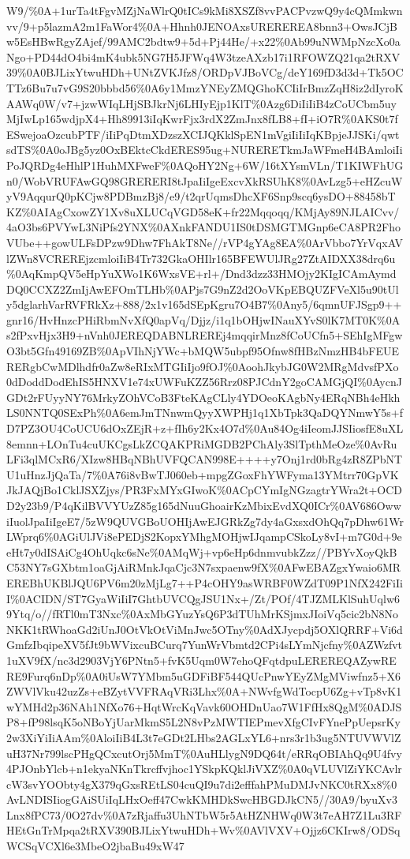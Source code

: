 \documentclass[]{article}
\begin{document}
W9/\%0A+1urTa4tFgvMZjNaWlrQ0tICs9kMi8XSZf8vvPACPvzwQ9y4cQMmkwnvv/9+p5lazmA2m1FaWor4\%0A+Hhnh0JENOAxsUREREREA8bnn3+OwsJCjBw5EsHBwRgyZAjef/99AMC2bdtw9+5d+Pj44He/+x22\%0Ab99uNWMpNzcXo0aNgo+PD44dO4bi4mK4ubk5NG7H5JFWq4W3tzeAXzb17i1RFOWZQ21qa2tRXV39\%0A0BJLixYtwuHDh+UNtZVKJfz8/ORDpVJBoVCg/deY169fD3d3d+Tk5OCTTz6Bu7u7vG9S20bbbd56\%0A6y1MmzYNEyZMQGhoKCIiIrBmzZqH8iz2dIyroKAAWq0W/v7+jzwWIqLHjSBJkrNj6LHIyEjp1KlT\%0Azg6DiIiIiB4zCoUCbm5uyMjIwLp165wdjpX4+Hh89913iIqKwrFjx3rdX2ZmJnx8fLB8+fI+iO7R\%0AKS0t7fESwejoaOzcubPTF/iIiPqDtmXDzszXCIJQKklSpEN1mVgiIiIiIqKBpjeJJSKi/qwtsdTS\%0A0oJBg5yz0OxBEktcCkdERES95ug+NURERETkmJaWFmeH4BAmloiIiPoJQRDg4eHhlP1HuhMXFweF\%0AQoHY2Ng+6W/16tXYsmVLn/T1KIWFhUGn0/WobVRUFAwGQ98GRERERI8tJpaIiIgeExcvXkRSUhK8\%0AvLzg5+eHZcuWyV9AqqurQ0pKCjw8PDBmzBj8/e9/t2qrUqmsDhcXF6Snp9scq6ysDO+88458bTKZ\%0AIAgCxowZY1Xv8uXLUCqVGD58eK+fr22Mqqoqq/KMjAy89NJLAICvv/4aO3bs6PVYwL3NiPfs2YNX\%0AXnkFANDU1IS0tDSMGTMGnp6eCA8PR2FhoVUbe++gowULFsDPzw9Dhw7FhAkT8Ne//rVP4gYAg8EA\%0ArVbbo7YrVqxAVlZWn8VCREREjzcmloiIiB4Tr732GkaOHIlr165BFEWUlJRg27ZtAIDXX38drq6u\%0AqKmpQV5eHpYuXWo1K6WxsVE+rl+/Dnd3dzz33HMOjy2KIgICAmAymdDQ0CCXZ2ZmIjAwEFOmTLHb\%0APjs7G9nZ2d2OoVKpEBQUZFVeXl5u90tUly5dglarhVarRVFRkXz+888/2x1v165dSEpKgru7O4B7\%0Any5/6qmnUFJSgp9++gnr16/HvHnzcPHiRbmNvXfQ0apVq/Djjz/i1q1bOHjwINauXYvS0lK7MT0K\%0As2fPxvHjx3H9+nVnh0JEREQDABNLREREj4mqqirMnz8fCoUCfn5+SEhIgMFgwO3bt5Gfn49169ZB\%0ApVIhNjYWc+bMQW5ubpf95Ofnw8fHBzNmzHB4bFEUERERgbCwMDlhdfr0aZw8eRIxMTGIiIjo9fOJ\%0AoohJkybJG0W2MRgMdvsfPXo0dDoddDodEhIS5HNXV1e74xUWFuKZZ56Rrz08PJCdnY2goCAMGjQI\%0AycnJGDt2rFUyyNY76MrkyZOhVCoB3FteKAgCLly4YDOeoKAgbNy4ERqNBh4eHkhLS0NNTQ0SExPh\%0A6emJmTNnwmQyyXWPHj1q1XbTpk3QaDQYNmwY5s+fD7PZ3OU4CoUCU6dOxZEjR+z+fIh6y2Kx4O7d\%0Au84Og4iIeomJJSIiosfE8uXL8emnn+LOnTu4cuUKCgsLkZCQAKPRiMGDB2PChAly3SlTpthMeOze\%0AvRuLFi3qlMCxR6/XIzw8HBqNBhUVFQCAN998E++++y7Onj1rd0bRg4zR8ZPbNTU1uHnzJjQaTa/7\%0A76i8vBwTJ060eb+mpgZGoxFhYWFyma13YMtrr70GpVKJkJAQjBo1CklJSXZjys/PR3FxMYxGIwoK\%0ACpCYmIgNGzagtrYWra2t+OCDD2y23b9/P4qKilBVVYUzZ85g165dNuuGhoairKzMbixEvdXQ0ICr\%0AV686OwwiIuolJpaIiIgeE7/5zW9QUVGBoUOHIjAwEJGRkZg7dy4aGxsxdOhQq7pDhw61WrLWprq6\%0AGiUlJVi8ePEDjS2KopxYMhgMOHjwIJqampCSkoLy8vI+m7G0d+9eeHt7y0dISAiCg4OhUqkc6sNe\%0AMqWj+vp6eHp6dnmvubkZzz//PBYvXoyQkBC53NY7sGXbtm1oaGjAiRMnkJqaCjc3N7sxpaenw9fX\%0AFwEBAZgxYwaio6MREREBhUKBlJQU6PV6m20zMjLg7++P4cOHY9asWRBF0WZdT09P1NfX242FiIiI\%0ACIDN/ST7GyaWiIiI7GhtbUVCQgJSU1Nx+/Zt/POf/4TJZMLKlSuhUqlw69Ytq/o//fRTl0mT3Nxc\%0AxMbGYuzYsQ6P3dTUhMrKSjmxJIoiVq5cic2bN8NoNKK1tRWhoaGd2iUnJ0OtVkOtViMnJwc5OTny\%0AdXJycpdj5OXlQRRF+Vi6dGmfzIbqipeXV5fJt9bWVixcuBCurq7YunWrVbmtd2CPi4sLYmNjcfny\%0AZWzfvt1uXV9fX/nc3d2903VjY6PNtn5+fvK5Uqm0W7ehoQFqtdpuLEREREQAZywRERE9Furq6nDp\%0A0iUsW7YMbm5uGDFiBF544QUcPnwYEyZMgMViwfnz5+X6ZWVlVku42uzZs+eBZytVVFRAqVRi3Lhx\%0A+NWvfgWdTocpU6Zg+vTp8vK1wYMHd2p36NAh1NfXo76+HqtWrcKqVavk60OHDnUao7W1FfHx8QgM\%0ADJSP8+fP98lsqK5oNBoYjUarMkmS5L2N8vPzMWTIEPmevXfgCIvFYnePpUepsrKy2w3XiYiIiAAm\%0AloiIiB4L3t7eGDt2LHbs2AGLxYL6+nrs3r1b3ug5NTUVWVlZuH37Nr799lscPHgQCxcutOrj5MmT\%0AuHLlygN9DQ64t/eRRqOBIAhQq9U4fvy4PJOnbYlcb+n1ekyaNKnTkrcffvjhoc1YSkpKQklJiVXZ\%0A0qVLUVlZiYKCAvlrcW3svYOObty4gX379qGxsREtLS04cuQI9u7di2efffahPMuDMJvNKC0tRXx8\%0AvLNDISIiogGAiSUiIqLHxOeff47CwkKMHDkSwcHBGDJkCN5//30A9/byuXv3Lnx8fPC73/0O27dv\%0A7zRjaffu3UhNTbW5r5AtHZNHWq0W3t7eAH7Z1Lu3RFHEtGnTrMpqa2tRXV390BJLixYtwuHDh+Wv\%0AVlVXV+Ojjz6CKIrw8/ODSqWCSqVCXl6e3MbeO2jbaBu49xW47
\end{document}
